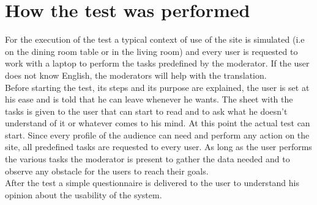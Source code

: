 \section{How the test was performed}
For the execution of the test a typical context of use of the site is simulated (i.e on the dining room table or in the living room) and every user is requested to work with a laptop to perform the tasks predefined by the moderator.
If the user does not know English, the moderators will help with the translation.\\
Before starting the test, its steps and its purpose are explained, the user is set at his ease and is told that he can leave whenever he wants.
The sheet with the tasks is given to the user that can start to read and to ask what he doesn't understand of it or whatever comes to his mind. At this point the actual test can start. Since every profile of the audience can need and perform any action on the site, all predefined tasks are requested to every user. As long as the user performs the various tasks the moderator is present to gather the data needed and to observe any obstacle for the users to reach their goals.\\
After the test a simple questionnaire is delivered to the user to understand his opinion about the usability of the system.

%
%

